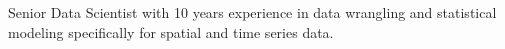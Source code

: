 \documentclass[]{deedy-resume-openfont}
\begin{document}
%
%
\texticons
\lastupdated

%
%

{Senior Data Scientist with 10 years experience in data wrangling and statistical modeling specifically for spatial and time series data.}
%
%
\end{document}
